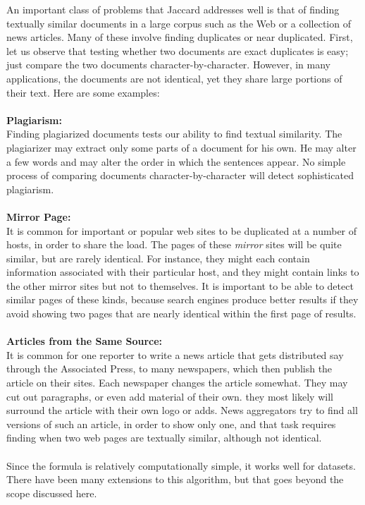 \documentclass[9pt]{extarticle} %
\begin{document}
\begin{minipage}[t]{.56\linewidth}
An important class of problems that Jaccard addresses well is that of finding textually similar documents in a large corpus such as the Web or a collection of news articles. Many of these involve finding duplicates or near duplicated. First, let us observe that testing whether two documents are exact duplicates is easy; just compare the two documents character-by-character. However, in many applications, the documents are not identical, yet they share large portions of their text. Here are some examples: \\
\\
\textbf{Plagiarism:} \\
Finding plagiarized documents tests our ability to find textual similarity. The plagiarizer may extract only some parts of a document for his own. He may alter a few words and may alter the order in which the sentences appear. No simple process of comparing documents character-by-character will detect sophisticated plagiarism. \\
\\
\textbf{Mirror Page:} \\
It is common for important or popular web sites to be duplicated at a number of hosts, in order to share the load. The pages of these \textit{mirror} sites will be quite similar, but are rarely identical. For instance, they might each contain information associated with their particular host, and they might contain links to the other mirror sites but not to themselves. It is important to be able to detect similar pages of these kinds, because search engines produce better results if they avoid showing two pages that are nearly identical within the first page of results. \\
\\
\textbf{Articles from the Same Source:} \\
It is common for one reporter to write a news article that gets distributed say through the Associated Press, to many newspapers, which then publish the article on their sites. Each newspaper changes the article somewhat. They may cut out paragraphs, or even add material of their own. they most likely will surround the article with their own logo or adds. News aggregators try to find all versions of such an article, in order to show only one, and that task requires finding when two web pages are textually similar, although not identical.  
\\
\\
Since the formula is relatively computationally simple, it works well for datasets. There have been many extensions to this algorithm, but that goes beyond the scope discussed here.



\end{minipage} %
\end{document}
